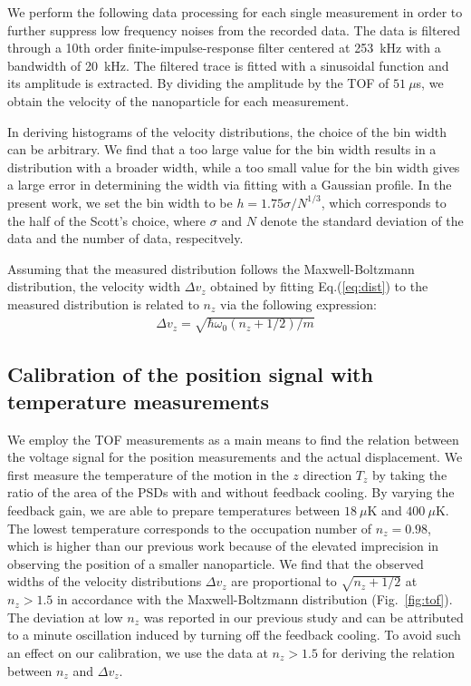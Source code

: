 \documentclass[aps, prl, 
amsmath, showpacs, preprintnumbers, twocolumn, amssymb, amsmath, superscriptaddress]{revtex4-1}
\begin{document}
We perform the following data processing for each single measurement in order to further suppress low frequency noises from the recorded data. The data is filtered through a 10th order finite-impulse-response filter centered at 253~kHz with a bandwidth of 20~kHz. The filtered trace is fitted with a sinusoidal function and its amplitude is extracted. By dividing the amplitude by the TOF of $51~\mu$s, we obtain the velocity of the nanoparticle for each measurement. 

In deriving histograms of the velocity distributions, the choice of the bin width can be arbitrary. We find that a too large value for the bin width results in a distribution with a broader width, while a too small value for the bin width gives a large error in determining the width via fitting with a Gaussian profile.  In the present work, we set the bin width to be $h=1.75\sigma/N^{1/3}$, which corresponds to the half of the Scott's choice, where $\sigma$ and $N$ denote the standard deviation of the data and the number of data, respecitvely. 

Assuming that the measured distribution follows the Maxwell-Boltzmann distribution, the velocity width $\Delta v_z$ obtained by fitting Eq.(\ref{eq:dist}) to the measured distribution is related to $n_z$ via the following expression:
\begin{eqnarray}
\Delta v_z = \sqrt{\hbar \omega_0 (n_z+1/2)/m}
\label{eq:vwidth}
\end{eqnarray}


\subsection{Calibration of the position signal with temperature measurements}
We employ the TOF measurements as a main means to find the relation between the voltage signal for the position measurements and the actual displacement. We first measure the temperature of the motion in the $z$ direction $T_z$ by taking the ratio of the area of the PSDs with and without feedback cooling. By varying the feedback gain, we are able to prepare temperatures between $18~\mu$K and $400~\mu$K. The lowest temperature corresponds to the occupation number of $n_z=0.98$, which is higher than our previous work because of the elevated imprecision in observing the position of a smaller nanoparticle.  We find that the observed widths of the velocity distributions $\Delta v_z$ are proportional to $\sqrt{n_z+1/2}$ at $n_z>1.5$ in accordance with the Maxwell-Boltzmann distribution (Fig.~\ref{fig:tof}). The deviation at low $n_z$ was reported in our previous study and can be attributed to a minute oscillation induced by turning off the feedback cooling. To avoid such an effect on our calibration, we use the data at $n_z>1.5$ for deriving the relation between $n_z$ and  $\Delta v_z$. 
\end{document}
